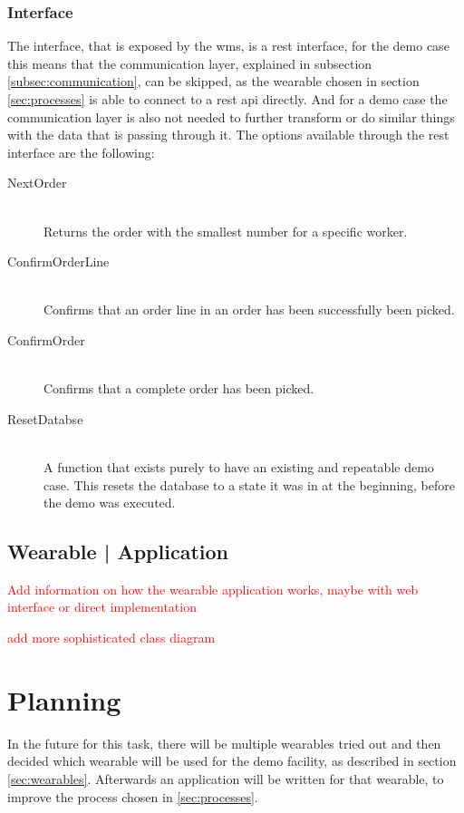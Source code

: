 \subsubsection{Interface}
The interface, that is exposed by the \gls{wms}, is a \gls{rest} interface, for the demo case this means that the communication layer, explained in subsection \ref{subsec:communication}, can be skipped, as the wearable chosen in section \ref{sec:processes} is able to connect to a \gls{rest} \gls{api} directly. And for a demo case the communication layer is also not needed to further transform or do similar things with the data that is passing through it. The options available through the \gls{rest} interface are the following:
\begin{description}
	\item[NextOrder] \hfill \\
	Returns the order with the smallest number for a specific worker.
	\item[ConfirmOrderLine] \hfill \\
	Confirms that an order line in an order has been successfully been picked.
	\item[ConfirmOrder] \hfill \\
	Confirms that a complete order has been picked.
	\item[ResetDatabse] \hfill \\
	A function that exists purely to have an existing and repeatable demo case. This resets the database to a state it was in at the beginning, before the demo was executed.
\end{description}

\subsection{Wearable | Application}
\textcolor{red}{Add information on how the wearable application works, maybe with web interface or direct implementation}

\textcolor{red}{add more sophisticated class diagram}

\section{Planning}
In the future for this task, there will be multiple wearables tried out and then decided which wearable will be used for the demo facility, as described in section \ref{sec:wearables}. Afterwards an application will be written for that wearable, to improve the process chosen in \ref{sec:processes}. 

